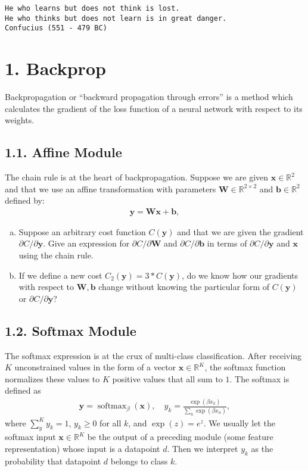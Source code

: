 \documentclass[12pt,letterpaper]{article}
\newcommand{\matr}[1]{\bm{#1}}     %
\newcommand{\vect}[1]{\bm{#1}}     %
\DeclareMathOperator{\softmax}{softmax}
\begin{document}
\begin{center}
\texttt{He who learns but does not think is lost. \\He who thinks but does not learn is in great danger. \\ Confucius (551 - 479 BC)}

\end{center}

\section*{1. Backprop}

Backpropagation or ``backward propagation through errors'' is a method which calculates the gradient of the loss function of a neural network with respect to its weights. 

\subsection*{1.1. Affine Module}
The chain rule is at the heart of backpropagation. Suppose we are given $\vect{x} \in \mathbb{R}^2$ and that we use an affine transformation with parameters
$\matr{W} \in \mathbb{R}^{2\times 2}$ and $\vect{b}\in \mathbb{R}^2$ defined by:
\begin{align}
\vect{y} = \matr{W} \vect{x} + \vect{b},
\end{align}
\begin{enumerate}[(a)]
    \item Suppose an arbitrary cost function $C(\vect{y})$ and that we are given the gradient $\partial C / \partial \vect{y}$. Give an expression for $ \partial C / \partial \matr{W}$ and $ \partial C / \partial \vect{b}$ in terms of $ \partial C / \partial \vect{y}$ and $\vect{x}$ using the chain rule.
    \item If we define a new cost $C_2(\vect{y}) = 3*C(\vect{y})$, do we know how our gradients with respect to $\vect{W,b}$ change without knowing the particular form of $C(\vect{y})$ or $ \partial C / \partial \vect{y}$?
\end{enumerate}



\subsection*{1.2. Softmax Module}
The softmax expression is at the crux of multi-class classification.
After receiving $K$ unconstrained values in the form of a vector $\vect{x} \in \mathbb{R}^K$, the softmax function normalizes these values to $K$ positive values that all sum to $1$. The softmax is defined as
\begin{align}
\vect{y}=\softmax_\beta(\vect{x}),
\quad 
 y_k = \frac{\exp(\beta x_k)}{\sum_{n} \exp(\beta x_{n})},
\end{align}
where $\sum_y^K y_k = 1$, $y_k \geq 0$ for all $k$, and $\exp(z)=e^z$. We usually let the softmax input $\vect{x} \in \mathbb{R}^K$ be the output of a preceding module (some feature representation) whose input is a datapoint $d$. Then we interpret $y_k$ as the probability that datapoint $d$ belongs to class $k$.\\
\end{document}
